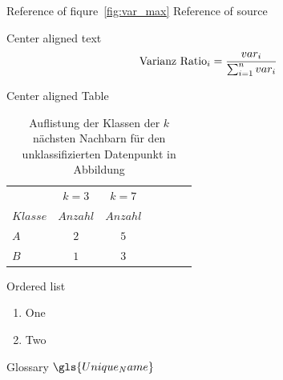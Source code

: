 \documentclass[envcountsame, envcountchap, deutsch]{i-studis}
\begin{document}
Reference of fiqure~\ref{fig:var_max}
Reference of source~\cite{6065061}

Center aligned text
\begin{align} %
    \textnormal{Varianz Ratio}_{i} = \frac{var_{i}}{\sum _{i=1}^{n} {var_{i}}} %
\end{align}

Center aligned Table
\begin{table} %
    \centering
    \begin{tabular}{lcccccl}
        \toprule 
        & \multicolumn{1}{c}{$k=3$} & \multicolumn{1}{c}{$k=7$}
        \\\cmidrule(lr){2-2}\cmidrule(lr){3-3}
        $Klasse$ & $Anzahl$ & $Anzahl$ \\
        $A$    &   $2$     & $5$       \\
        $B$ &   $1$     & $3$       \\\bottomrule
    \end{tabular}
    \caption{Auflistung der Klassen der $k$ nächsten Nachbarn für den unklassifizierten Datenpunkt in Abbildung}\label{tab:majority_rule}
\end{table}

Ordered list
\begin{enumerate} %
    \item One
    \item Two
\end{enumerate}

Glossary
$\gls{Unique_Name}$


\backmatter{}
\printbibliography{}
\printindex
\printnoidxglossaries										%
\end{document}
